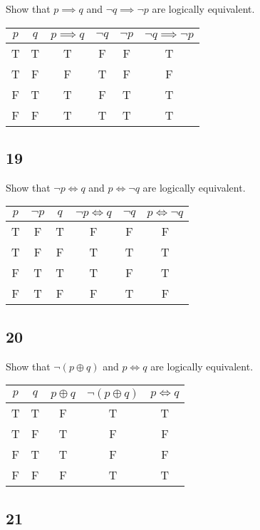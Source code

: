 \documentclass{article}
\begin{document}
Show that $ p \implies q $ and $ \neg q \implies \neg p $ are logically equivalent.

\begin{tabular}{ | c | c | c | c | c | c | }
	$ p $ & $ q $ & $ p \implies q $ & $ \neg q $ & $ \neg p $ & $ \neg q \implies \neg p $ \\
	\hline
	T & T & T & F & F & T \\
	T & F & F & T & F & F \\
	F & T & T & F & T & T \\
	F & F & T & T & T & T \\
\end{tabular}

\subsection{19}

Show that $ \neg p \iff q $ and $ p \iff \neg q $ are logically equivalent.

\begin{tabular}{ | c | c | c | c | c | c | }
	$ p $ & $ \neg p $ & $ q $ & $ \neg p \iff q $ & $ \neg q $ & $ p \iff \neg q $ \\
	\hline
	T & F & T & F & F & F \\
	T & F & F & T & T & T \\
	F & T & T & T & F & T \\
	F & T & F & F & T & F \\
\end{tabular}

\subsection{20}

Show that $ \neg ( p \oplus q ) $ and $ p \iff q $ are logically equivalent.

\begin{tabular}{ | c | c | c | c | c | }
	$ p $ & $ q $ & $ p \oplus q $ & $ \neg ( p \oplus q ) $ & $ p \iff q $ \\
	\hline
	T & T & F & T & T \\
	T & F & T & F & F \\
	F & T & T & F & F \\
	F & F & F & T & T \\
\end{tabular}

\subsection{21}
\end{document}
